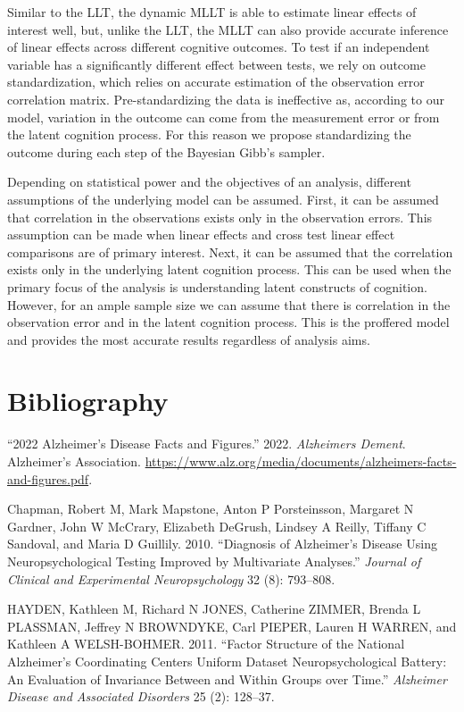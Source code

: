 \documentclass[
]{article}
\newlength{\cslhangindent}
\newenvironment{CSLReferences}[2] %
 {%
  \setlength{\parindent}{0pt}
  \ifodd #1 \everypar{\setlength{\hangindent}{\cslhangindent}}\ignorespaces\fi
  \ifnum #2 > 0
  \setlength{\parskip}{#2\baselineskip}
  \fi
 }%
 {}
\begin{document}
Similar to the LLT, the dynamic MLLT is able to estimate linear effects of interest well, but, unlike the LLT, the MLLT can also provide accurate inference of linear effects across different cognitive outcomes. To test if an independent variable has a significantly different effect between tests, we rely on outcome standardization, which relies on accurate estimation of the observation error correlation matrix. Pre-standardizing the data is ineffective as, according to our model, variation in the outcome can come from the measurement error or from the latent cognition process. For this reason we propose standardizing the outcome during each step of the Bayesian Gibb's sampler.

Depending on statistical power and the objectives of an analysis, different assumptions of the underlying model can be assumed. First, it can be assumed that correlation in the observations exists only in the observation errors. This assumption can be made when linear effects and cross test linear effect comparisons are of primary interest. Next, it can be assumed that the correlation exists only in the underlying latent cognition process. This can be used when the primary focus of the analysis is understanding latent constructs of cognition. However, for an ample sample size we can assume that there is correlation in the observation error and in the latent cognition process. This is the proffered model and provides the most accurate results regardless of analysis aims.

\newpage{}

\hypertarget{bibliography}{%
\section*{Bibliography}\label{bibliography}}

\hypertarget{refs}{}
\begin{CSLReferences}{1}{0}
\leavevmode{}%
{``2022 Alzheimer's Disease Facts and Figures.''} 2022. \emph{Alzheimers Dement}. Alzheimer's Association. \url{https://www.alz.org/media/documents/alzheimers-facts-and-figures.pdf}.

\leavevmode{}%
Chapman, Robert M, Mark Mapstone, Anton P Porsteinsson, Margaret N Gardner, John W McCrary, Elizabeth DeGrush, Lindsey A Reilly, Tiffany C Sandoval, and Maria D Guillily. 2010. {``Diagnosis of Alzheimer's Disease Using Neuropsychological Testing Improved by Multivariate Analyses.''} \emph{Journal of Clinical and Experimental Neuropsychology} 32 (8): 793--808.

\leavevmode{}%
HAYDEN, Kathleen M, Richard N JONES, Catherine ZIMMER, Brenda L PLASSMAN, Jeffrey N BROWNDYKE, Carl PIEPER, Lauren H WARREN, and Kathleen A WELSH-BOHMER. 2011. {``Factor Structure of the National Alzheimer's Coordinating Centers Uniform Dataset Neuropsychological Battery: An Evaluation of Invariance Between and Within Groups over Time.''} \emph{Alzheimer Disease and Associated Disorders} 25 (2): 128--37.

\end{CSLReferences}
\end{document}
